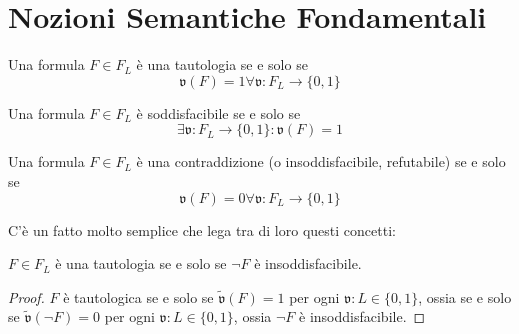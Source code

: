 \section{Nozioni Semantiche Fondamentali}

\begin{defi}[Tautologia]
Una formula $F \in F_L$ è una tautologia se e solo se 
$$
\mathfrak{v}(F) = 1 \forall \mathfrak{v} : F_L \rightarrow \{0,1\}
$$
\end{defi}
\begin{defi}
Una formula $F \in F_L$ è soddisfacibile se e solo se 
$$
\exists \mathfrak{v}:F_L \rightarrow \{0,1\} : \mathfrak{v}(F) = 1
$$
\end{defi}
\begin{defi}[Contraddizione]
Una formula $F \in F_L$ è una contraddizione (o insoddisfacibile, refutabile) se e solo 
se 
$$
\mathfrak{v}(F) = 0 \forall \mathfrak{v}: F_L \rightarrow \{0,1\}
$$
\end{defi}
C'è un fatto molto semplice che lega tra di loro questi concetti: 
\begin{teo}
$F \in F_L$ è una tautologia se e solo se $\neg F$ è insoddisfacibile. 
\end{teo}
\begin{proof}
  $F$ è tautologica se e solo se $\widetilde{\mathfrak{v}}(F) = 1$ per 
  ogni $\mathfrak{v}: L \in \{0,1\}$, ossia se e solo se $\widetilde{\mathfrak{v}}(\neg F) 
  = 0$ per ogni $\mathfrak{v}: L \in \{0,1\}$, ossia $\neg F$ è insoddisfacibile. 
\end{proof}


